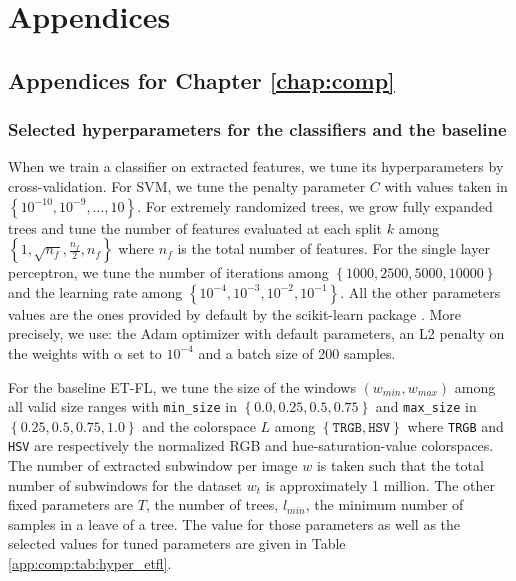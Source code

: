 \part{Appendices}

\chapter{Appendices for Chapter \ref{chap:comp}}

\section{Selected hyperparameters for the classifiers and the baseline}
\label{app:comp:sec:selectedhyperparameters}

When we train a classifier on extracted features, we tune its hyperparameters by cross-validation. For SVM, we tune the penalty parameter $C$ with values taken in 
$\left\{10^{-10}, 10^{-9},...,10\right\}$. For extremely randomized trees, we grow fully expanded trees and tune the number of features evaluated at each split $k$ among $\left\{1, \sqrt{n_f}, \frac{n_f}{2}, n_f\right\}$ where 
$n_f$ is the total number of features. For the single layer perceptron, we tune the number of iterations among $\left\{1000, 2500, 5000, 10000\right\}$ and the learning rate among $\left\{10^{-4}, 10^{-3}, 10^{-2}, 10^{-1}\right\}$. All the other parameters values are the ones provided by default by the scikit-learn package \parencite{scikit-learn}. More precisely, we use: the Adam \parencite{kingma2014adam} optimizer with default parameters, an L2 penalty on the weights with $\alpha$ set to $10^{-4}$ and a batch size of 200 samples.

For the baseline ET-FL, we tune the size of the windows $\left(w_{min}, w_{max}\right)$ among all valid size ranges with \texttt{min\_size} in $\left\{0.0, 0.25, 0.5, 0.75\right\}$ and \texttt{max\_size} in $\left\{0.25, 0.5, 0.75, 1.0\right\}$ and the colorspace $L$ among $\left\{\texttt{TRGB}, \texttt{HSV}\right\}$ where \texttt{TRGB} and \texttt{HSV} are respectively the normalized RGB and hue-saturation-value colorspaces. The number of extracted subwindow per image $w$ is taken such that the total number of subwindows for the dataset $w_t$ is approximately 1 million. The other fixed parameters are $T$, the number of trees, $l_{min}$, the minimum number of samples in a leave of a tree. The value for those parameters as well as the selected values for tuned parameters are given in Table \ref{app:comp:tab:hyper_etfl}. 

